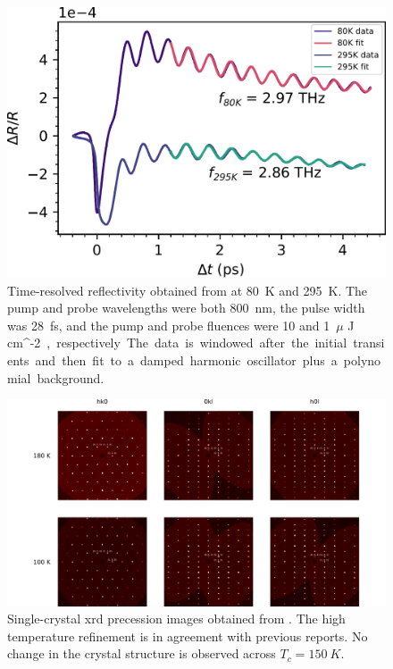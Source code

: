 \begin{figure}
\centering
\includegraphics[width=\textwidth]{./gfx/ch6/pp.pdf}
\captionsetup{singlelinecheck=off}
\caption[Pump-probe spectroscopy of \cmb]{
\label{cmb-pp}
Time-resolved reflectivity obtained from \cmb at \qty{80}{K} and \qty{295}{K}.
The pump and probe wavelengths were both \qty{800}{nm}, the pulse width was \qty{28}{fs}, and the pump and probe fluences were \num{10} and \qty{1}{$\mu$ J \cdot cm^{-2}}, respectively.
The data is windowed after the initial transients and then fit to a damped harmonic oscillator plus a polynomial background.
}
\end{figure}

\begin{figure}
\centering
\includegraphics[width=\textwidth]{./gfx/ch6/xrd.pdf}
\captionsetup{singlelinecheck=off}
\caption[ of \cmb]{
\label{cmb-xrd}
Single-crystal \gls{xrd} precession images obtained from \cmb.
The high temperature refinement is in agreement with previous reports\citep{gibson_magnetic_2015}.
No change in the crystal structure is observed across $T_c=\qty{150}{K}$.
}
\end{figure}

